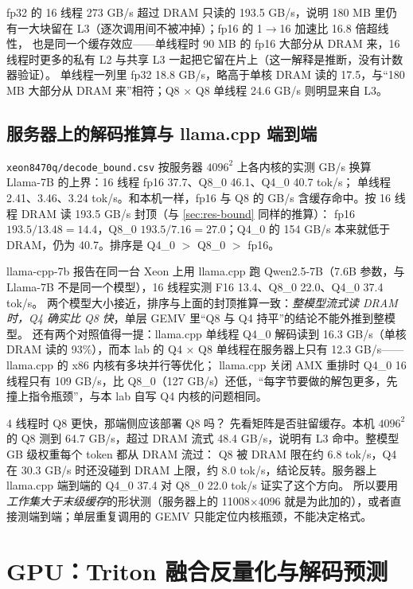\documentclass[11pt,a4paper]{ctexart}
\begin{document}
fp32 的 16 线程 273 GB/s 超过 DRAM 只读的 193.5 GB/s，说明 180 MB 里仍有一大块留在 L3（逐次调用间不被冲掉）；fp16 的 1$\to$16 加速比 16.8 倍超线性，
也是同一个缓存效应——单线程时 90 MB 的 fp16 大部分从 DRAM 来，16 线程时更多的私有 L2 与共享 L3 一起把它留在片上（这一解释是推断，没有计数器验证）。
单线程一列里 fp32 18.8 GB/s，略高于单核 DRAM 读的 17.5，与“180 MB 大部分从 DRAM 来”相符；Q8 × Q8 单线程 24.6 GB/s 则明显来自 L3。

\subsection{服务器上的解码推算与 llama.cpp 端到端}\label{sec:server-e2e}

\nolinkurl{xeon8470q/decode_bound.csv} 按服务器 $4096^2$ 上各内核的实测 GB/s 换算 Llama-7B 的上界：16 线程 fp16 37.7、Q8\_0 46.1、Q4\_0 40.7 tok/s；
单线程 2.41、3.46、3.24 tok/s。和本机一样，fp16 与 Q8 的 GB/s 含缓存命中。按 16 线程 DRAM 读 193.5 GB/s 封顶（与 \cref{sec:res-bound} 同样的推算）：
fp16 $193.5/13.48 = 14.4$，Q8\_0 $193.5/7.16 = 27.0$；Q4\_0 的 154 GB/s 本来就低于 DRAM，仍为 40.7。排序是 Q4\_0 $>$ Q8\_0 $>$ fp16。

llama-cpp-7b 报告在同一台 Xeon 上用 llama.cpp 跑 Qwen2.5-7B（7.6B 参数，与 Llama-7B 不是同一个模型），16 线程实测 F16 13.4、Q8\_0 22.0、Q4\_0 37.4 tok/s。
两个模型大小接近，排序与上面的封顶推算一致：\emph{整模型流式读 DRAM 时，Q4 确实比 Q8 快}，单层 GEMV 里“Q8 与 Q4 持平”的结论不能外推到整模型。
还有两个对照值得一提：llama.cpp 单线程 Q4\_0 解码读到 16.3 GB/s（单核 DRAM 读的 93\%），而本 lab 的 Q4 × Q8 单线程在服务器上只有 12.3 GB/s——llama.cpp 的 x86 内核有多块并行等优化；
llama.cpp 关闭 AMX 重排时 Q4\_0 16 线程只有 109 GB/s，比 Q8\_0（127 GB/s）还低，“每字节要做的解包更多，先撞上指令瓶颈”，与本 lab 自写 Q4 内核的问题相同。

\begin{iqbox}{4 线程时 Q8 更快，那端侧应该部署 Q8 吗？}
先看矩阵是否驻留缓存。本机 $4096^2$ 的 Q8 测到 64.7 GB/s，超过 DRAM 流式 48.4 GB/s，说明有 L3 命中。整模型 GB 级权重每个 token 都从 DRAM 流过：
Q8 被 DRAM 限在约 6.8 tok/s，Q4 在 30.3 GB/s 时还没碰到 DRAM 上限，约 8.0 tok/s，结论反转。服务器上 llama.cpp 端到端的 Q4\_0 37.4 对 Q8\_0 22.0 tok/s 证实了这个方向。
所以要用\emph{工作集大于末级缓存}的形状测（服务器上的 11008×4096 就是为此加的），或者直接测端到端；单层重复调用的 GEMV 只能定位内核瓶颈，不能决定格式。
\end{iqbox}

\section{GPU：Triton 融合反量化与解码预测}\label{sec:gpu}
\end{document}
